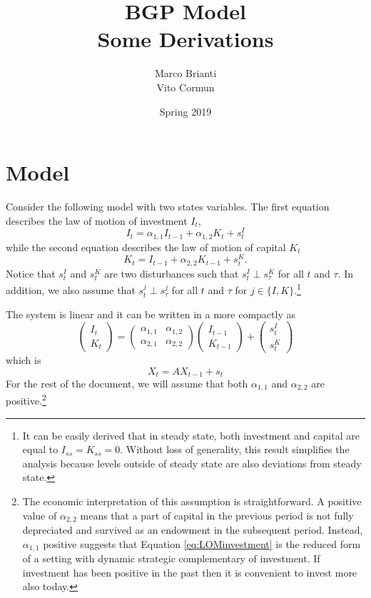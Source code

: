 \documentclass{article}
\title{BGP Model\\Some Derivations}
\author{Marco Brianti\\Vito Cormun}
\date{Spring 2019}
\begin{document}
\maketitle

\section{Model}\label{sec:model}

Consider the following model with two states variables. The first equation describes the law of motion of investment $I_t$,
\begin{equation}\label{eq:LOMinvestment}
I_t = \alpha_{1,1} I_{t-1} + \alpha_{1,2} K_{t} + s_t^I
\end{equation}
while the second equation describes the law of motion of capital $K_t$
\begin{equation}\label{eq:LOMcapital}
K_t =  I_{t-1} + \alpha_{2,2} K_{t-1} + s_t^K.
\end{equation}
Notice that $s_t^I$ and $s_t^K$ are two disturbances such that $s_t^I \perp s_{\tau}^K$ for all $t$ and $\tau$. In addition, we also assume that $s_t^j \perp s_{\tau}^j$ for all $t$ and $\tau$ for $j \in \{ I,K\}$.\footnote{It can be easily derived that in steady state, both investment and capital are equal to $I_{ss} = K_{ss} = 0$. Without loss of generality, this result simplifies the analysis because levels outside of steady state are also deviations from steady state.}

The system is linear and it can be written in a more compactly as
\begin{equation}\label{eq:matrix_system_expanded}
\begin{pmatrix}
I_t \\
K_t
\end{pmatrix} = \begin{pmatrix}
\alpha_{1,1} & \alpha_{1,2} \\
\alpha_{2,1} & \alpha_{2,2}
\end{pmatrix}\begin{pmatrix}
I_{t-1} \\
K_{t-1}
\end{pmatrix} + \begin{pmatrix}
s_t^I \\ 
s_t^K
\end{pmatrix}
\end{equation}
which is
\begin{equation}\label{eq:matrix_system_compact}
X_t = A X_{t-1} + s_t
\end{equation}
For the rest of the document, we will assume that both $\alpha_{1,1}$ and $\alpha_{2,2}$ are positive.\footnote{The economic interpretation of this assumption is straightforward. A positive value of $\alpha_{2,2}$ means that a part of capital in the previous period is not fully depreciated and survived as an endowment in the subsequent period. Instead, $\alpha_{1,1}$ positive suggests that Equation \ref{eq:LOMinvestment} is the reduced form of a setting with dynamic strategic complementary of investment. If investment has been positive in the past then it is convenient to invest more also today.}
\end{document}
